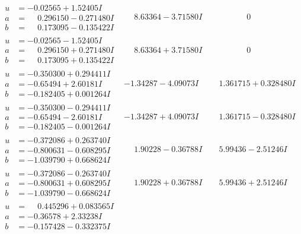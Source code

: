 \documentclass[1p]{elsarticle_modified}
\theoremstyle{definition}
\begin{document}
$$\begin{array}{c|c|c}
\begin{aligned}
u &= -0.02565 + 1.52405 I \\
a &= \phantom{-}0.296150 - 0.271480 I \\
b &= \phantom{-}0.173095 - 0.135422 I\end{aligned}
 & \phantom{-}8.63364 - 3.71580 I & \phantom{-0.000000 } 0 \\ \hline\begin{aligned}
u &= -0.02565 - 1.52405 I \\
a &= \phantom{-}0.296150 + 0.271480 I \\
b &= \phantom{-}0.173095 + 0.135422 I\end{aligned}
 & \phantom{-}8.63364 + 3.71580 I & \phantom{-0.000000 } 0 \\ \hline\begin{aligned}
u &= -0.350300 + 0.294411 I \\
a &= -0.65494 + 2.60181 I \\
b &= -0.182405 + 0.001264 I\end{aligned}
 & -1.34287 - 4.09073 I & \phantom{-}1.361715 + 0.328480 I \\ \hline\begin{aligned}
u &= -0.350300 - 0.294411 I \\
a &= -0.65494 - 2.60181 I \\
b &= -0.182405 - 0.001264 I\end{aligned}
 & -1.34287 + 4.09073 I & \phantom{-}1.361715 - 0.328480 I \\ \hline\begin{aligned}
u &= -0.372086 + 0.263740 I \\
a &= -0.800631 - 0.608295 I \\
b &= -1.039790 + 0.668624 I\end{aligned}
 & \phantom{-}1.90228 - 0.36788 I & \phantom{-}5.99436 - 2.51246 I \\ \hline\begin{aligned}
u &= -0.372086 - 0.263740 I \\
a &= -0.800631 + 0.608295 I \\
b &= -1.039790 - 0.668624 I\end{aligned}
 & \phantom{-}1.90228 + 0.36788 I & \phantom{-}5.99436 + 2.51246 I \\ \hline\begin{aligned}
u &= \phantom{-}0.445296 + 0.083565 I \\
a &= -0.36578 + 2.33238 I \\
b &= -0.157428 - 0.332375 I\end{aligned}

\end{array}$$
\end{document}
